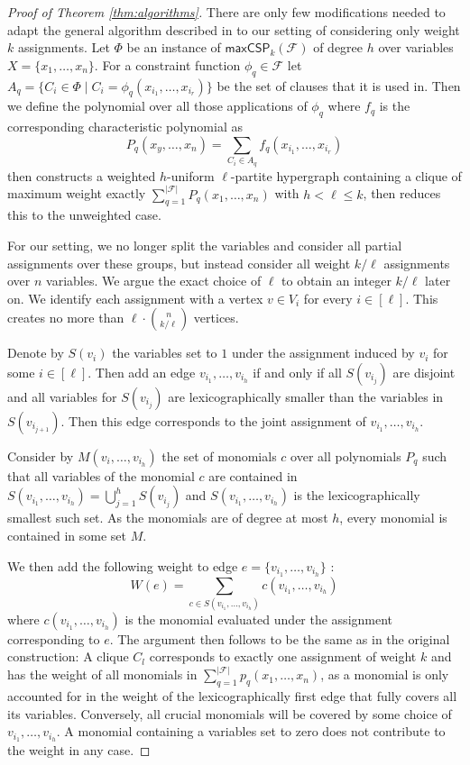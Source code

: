 \documentclass[a4paper,UKenglish,cleveref, autoref, thm-restate,numberwithinsect]{lipics-v2021}
\newcommand{\maxcspk}{\textsf{maxCSP}_{k}}
\newcommand{\Fam}{\mathcal{F}}
\begin{document}
\begin{proof}[Proof of Theorem \ref{thm:algorithms}]
There are only few modifications needed to adapt the general algorithm described in \cite{LincolnWW18} to our setting of considering only weight $k$ assignments.
Let $\Phi$ be an instance of $\maxcspk(\Fam)$ of degree $h$ over variables $X = \{x_1,\dots,x_n\}$.
For a constraint function $\phi_q \in \Fam$ let $A_q = \{C_i \in \Phi \mid C_i = \phi_q(x_{i_1},\dots,x_{i_r})\}$ be the set of clauses that it is used in.
Then we define the polynomial over all those applications of $\phi_q$ where $f_q$ is the corresponding characteristic polynomial as
\[
    P_q(x_y,\dots,x_n) = \sum_{C_i \in A_q} f_q(x_{i_1},\dots,x_{i_r}) 
\]
then constructs a weighted $h$-uniform $\ell$-partite hypergraph 
containing a clique of maximum weight exactly $\sum_{q=1}^{|\Fam|} P_q(x_1,\dots,x_n)$ with $h<\ell\leq k$, then reduces this to the unweighted case.

For our setting, we no longer split the variables and consider all partial assignments over these groups, but instead consider all weight $k/\ell$ assignments over $n$ variables. We argue the exact choice of $\ell$ to obtain an integer $k/\ell$ later on.
We identify each assignment with a vertex $v \in V_i$ for every $i \in [\ell]$. This creates no more than $\ell \cdot {n \choose {k/\ell}}$ vertices. 

Denote by $S(v_i)$ the variables set to $1$ under the assignment induced by $v_i$ for some $i\in [\ell]$.
Then add an edge $v_{i_1},\dots,v_{i_{h}}$ if and only if all $S(v_{i_j})$ are disjoint and all variables for $S(v_{i_j})$ are lexicographically smaller than the variables in $S(v_{i_{j+1}})$. Then this edge corresponds to the joint assignment of $v_{i_1},\dots,v_{i_{h}}$.

Consider by $M(v_{i},\dots,v_{i_{h}})$ the set of monomials $c$ over all polynomials $P_q$ such that 
all variables of the monomial $c$ are contained in $S(v_{i_1},\dots,v_{i_h}) = \bigcup_{j=1}^h S(v_{i_j})$ and $S(v_{i_1},\dots,v_{i_h})$ is the lexicographically smallest such set.
As the monomials are of degree at most $h$, every monomial is contained in some set $M$.

We then add the following weight to edge $e = \{v_{i_1},\dots,v_{i_{h}}\}$ :
\[
   W(e) = \sum_{c \in S(v_{i_1},\dots,v_{i_{h}})} c(v_{i_1},\dots,v_{i_{h}})
\]
where $c(v_{i_1},\dots,v_{i_{h}})$ is the monomial evaluated under the assignment corresponding to $e$.
The argument then follows to be the same as in the original construction: A clique $C_l$ corresponds to exactly one assignment of weight $k$ and has the weight of all monomials in $\sum_{q=1}^{|\Fam|}p_q(x_1,\dots,x_n)$, as a monomial is only accounted for in the weight of the lexicographically first edge that fully covers all its variables. Conversely, all crucial monomials will be covered by some choice of $v_{i_1},\dots,v_{i_h}$. A monomial containing a variables set to zero does not contribute to the weight in any case.


\end{proof}
\end{document}
